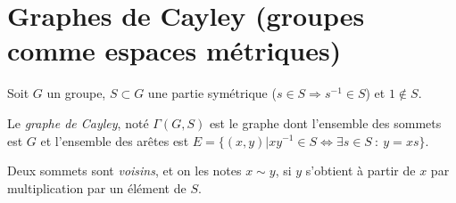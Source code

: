 
\chapter{Graphes de Cayley (groupes comme espaces métriques)}
\label{sec:graphes-de-Cayley}

  Soit $G$ un groupe, $S \subset G$ une partie symétrique ($s \in S \Rightarrow s^{-1} \in S$) et $1 \notin
  S$.

  \begin{defi} 
    Le \emph{graphe de Cayley}, noté $\Gamma(G, S)$ est le graphe dont l'ensemble des sommets est $G$ et
    l'ensemble des arêtes est $E = \{(x,y) | xy^{-1} \in S \iff \exists s \in S\ :\ y = xs\}$.

    Deux sommets sont \emph{voisins}, et on les notes $x \sim y$, si $y$ s'obtient à partir de $x$ par
    multiplication par un élément de $S$.
  \end{defi}

